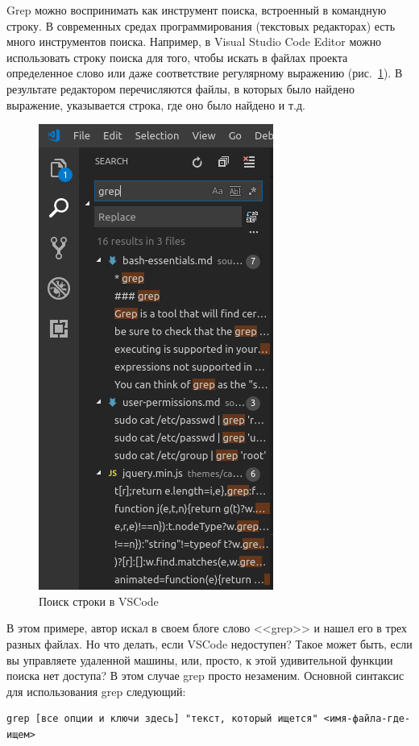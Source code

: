 \documentclass[12pt]{article}
\begin{document}
Grep можно воспринимать как инструмент поиска, встроенный в командную
строку. В современных средах программирования (текстовых редакторах)
есть много инструментов поиска. Например, в Visual Studio Code Editor
можно использовать строку поиска для того, чтобы искать в файлах проекта
определенное слово или даже соответствие регулярному выражению (рис.~\ref{fig:vscodesearch}). В
результате редактором перечисляются файлы, в которых было найдено
выражение, указывается строка, где оно было найдено и т.д.
\begin{figure}[tbh]\centering

\includegraphics[width=0.5\linewidth]{blog/2019/bash-essentials/vscode-search.png}

\caption{Поиск строки в VSCode}
\label{fig:vscodesearch}
\end{figure}
В этом примере, автор искал в своем блоге слово <<grep>> и нашел его в
трех разных файлах. Но что делать, если VSCode недоступен? Такое может
быть, если вы управляете удаленной машины, или, просто, к этой
удивительной функции поиска нет доступа? В этом случае grep просто
незаменим. Основной синтаксис для использования grep следующий:

\begin{verbatim}
grep [все опции и ключи здесь] "текст, который ищется" <имя-файла-где-ищем>
\end{verbatim}
\end{document}
